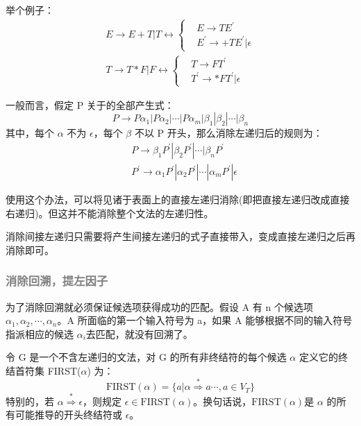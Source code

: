 举个例子：
\begin{equation}
    \begin{aligned}
        E \rightarrow E+T|T \longleftrightarrow
        \left\{
        \begin{aligned}
             & E \rightarrow TE^{'}               \\
             & E^{'} \rightarrow +TE^{'}|\epsilon
        \end{aligned}
        \right. \\
        T \rightarrow T*F|F \longleftrightarrow
        \left\{
        \begin{aligned}
             & T \rightarrow FT^{'}               \\
             & T^{'} \rightarrow *FT^{'}|\epsilon
        \end{aligned}
        \right. \nonumber
    \end{aligned}
\end{equation}

一般而言，假定 P 关于的全部产生式：
\[ P \rightarrow P\alpha_1 | P\alpha_2 | \cdots | P\alpha_m | \beta_1 | \beta_2 | \cdots | \beta_n \]
其中，每个 $\alpha$ 不为 $\epsilon$，每个 $\beta$ 不以 P 开头，那么消除左递归后的规则为：
\begin{equation}
    \begin{aligned}
         & P \rightarrow \beta_1P^{'} | \beta_2P^{'} | \cdots | \beta_nP^{'}                             \\
         & P^{'} \rightarrow \alpha_1P^{'} | \alpha_2P^{'} | \cdots | \alpha_mP^{'} | \epsilon \nonumber
    \end{aligned}
\end{equation}

使用这个办法，可以将见诸于表面上的直接左递归消除(即把直接左递归改成直接右递归)。但这并不能消除整个文法的左递归性。

消除间接左递归只需要将产生间接左递归的式子直接带入，变成直接左递归之后再消除即可。

\subsubsection{\textcolor{grey}{消除回溯，提左因子}}

为了消除回溯就必须保证候选项获得成功的匹配。假设 A 有 n 个候选项 $\alpha_1,\alpha_2,\cdots,\alpha_n$。A 所面临的第一个输入符号为 a，如果 A 能够根据不同的输入符号指派相应的候选 $\alpha_i$去匹配，就没有回溯了。

令 G 是一个不含左递归的文法，对 G 的所有非终结符的每个候选 $\alpha$ 定义它的终结首符集 FIRST($\alpha$) 为：
\[\text{FIRST}(\alpha) = \{ a | \alpha \stackrel{*}{\Rightarrow} a \cdots, a \in V_{T} \}\]
特别的，若 $\alpha \stackrel{*}{\Rightarrow} \epsilon$，则规定 $\epsilon \in \text{FIRST}(\alpha)$。换句话说，$\text{FIRST}(\alpha)$是 $\alpha$ 的所有可能推导的开头终结符或 $\epsilon$。

